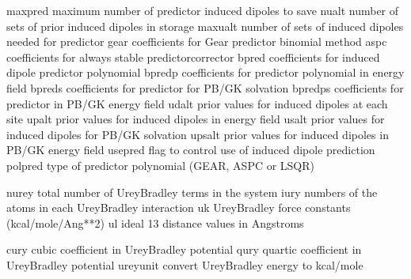 \documentclass[letterpaper,11pt,english]{sphinxmanual}
\begin{document}

\begin{sphinxVerbatim}[commandchars=\\\{\}]
maxpred         maximum number of predictor induced dipoles to save
nualt           number of sets of prior induced dipoles in storage
maxualt         number of sets of induced dipoles needed for predictor
gear            coefficients for Gear predictor binomial method
aspc            coefficients for always stable predictor\PYGZhy{}corrector
bpred           coefficients for induced dipole predictor polynomial
bpredp          coefficients for predictor polynomial in energy field
bpreds          coefficients for predictor for PB/GK solvation
bpredps         coefficients for predictor in PB/GK energy field
udalt           prior values for induced dipoles at each site
upalt           prior values for induced dipoles in energy field
usalt           prior values for induced dipoles for PB/GK solvation
upsalt          prior values for induced dipoles in PB/GK energy field
use\PYGZus{}pred        flag to control use of induced dipole prediction
polpred         type of predictor polynomial (GEAR, ASPC or LSQR)
\end{sphinxVerbatim}


\begin{sphinxVerbatim}[commandchars=\\\{\}]
nurey           total number of Urey\PYGZhy{}Bradley terms in the system
iury            numbers of the atoms in each Urey\PYGZhy{}Bradley interaction
uk              Urey\PYGZhy{}Bradley force constants (kcal/mole/Ang**2)
ul              ideal 1\PYGZhy{}3 distance values in Angstroms
\end{sphinxVerbatim}


\begin{sphinxVerbatim}[commandchars=\\\{\}]
cury            cubic coefficient in Urey\PYGZhy{}Bradley potential
qury            quartic coefficient in Urey\PYGZhy{}Bradley potential
ureyunit        convert Urey\PYGZhy{}Bradley energy to kcal/mole
\end{sphinxVerbatim}

\end{document}
